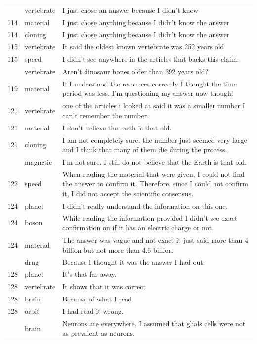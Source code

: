 \documentclass[
  doc,floatsintext]{apa6}
\begin{document}
\begin{longtable}[t]{>{}r>{}l>{\raggedright\arraybackslash}p{30em}}
\addlinespace
114 & vertebrate & I just chose an answer because I didn't know\\
114 & material & I just chose anything because I didn't know the answer\\
114 & cloning & I just chose anything because I didn't know the answer\\
115 & vertebrate & It said the oldest known vertebrate was 252 years old\\
115 & speed & I didn’t see anywhere in the articles that backs this claim.\\
\addlinespace
118 & vertebrate & Aren't dinosaur bones older than 392 years old?\\
119 & material & If I understood the resources correctly I thought the time period was less. I'm questioning my answer now though!\\
121 & vertebrate & one of the articles i looked at said it was a smaller number I can't remember the number.\\
121 & material & I don't believe the earth is that old.\\
121 & cloning & I am not completely sure.  the number just seemed very large and I think that many of them die during the process.\\
\addlinespace
121 & magnetic & I'm not sure.  I still do not believe that the Earth is that old.\\
122 & speed & When reading the material that were given, I could not find the answer to confirm it. Therefore, since I could not confirm it, I did not accept the scientific consensus.\\
124 & planet & I didn't really understand the information on this one.\\
124 & boson & While reading the information provided I didn't see exact confirmation on if it has an electric charge or not.\\
124 & material & The answer was vague and not exact it just said more than 4 billion but not more than 4.6 billion.\\
\addlinespace
128 & drug & Because I thought it was the answer I had out.\\
128 & planet & It’s that far away.\\
128 & vertebrate & It shows that it was correct\\
128 & brain & Because of what I read.\\
128 & orbit & I had read it wrong.\\
\addlinespace
130 & brain & Neurons are everywhere.  I assumed that glials cells were not as prevalent as neurons.\\

\end{longtable}
\end{document}
